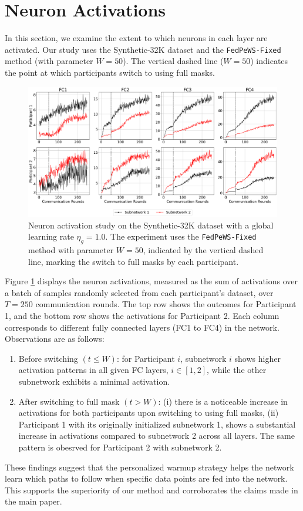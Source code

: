 \documentclass{article}
\begin{document}
\section{Neuron Activations} 
In this section, we examine the extent to which neurons in each layer are activated. Our study uses the Synthetic-32K dataset and the \texttt{FedPeWS-Fixed} method (with parameter $W = 50$). The vertical dashed line ($W=50$) indicates the point at which participants switch to using full masks. 

\begin{figure}[b]
    \centering
    \includegraphics[width=\linewidth]{images/neuron-activation-trainset.pdf}
    \caption{Neuron activation study on the Synthetic-32K dataset with a global learning rate $\eta_g=1.0$. The experiment uses the \texttt{FedPeWS-Fixed} method with parameter $W=50$, indicated by the vertical dashed line, marking the switch to full masks by each participant.} 
    \label{fig: neuron-activations-train}
\end{figure} 

Figure \ref{fig: neuron-activations-train} displays the neuron activations, measured as the sum of activations over a batch of samples randomly selected from each participant's dataset, over $T=250$ communication rounds. The top row shows the outcomes for Participant 1, and the bottom row shows the activations for Participant 2. Each column corresponds to different fully connected layers (FC1 to FC4) in the network. Observations are as follows: 
\begin{enumerate}
    \item Before switching $(t \leq W)$: for Participant $i$, subnetwork $i$ shows higher activation patterns in all given FC layers, $i \in [1,2]$, while the other subnetwork exhibits a minimal activation. 
    \item After switching to full mask $(t > W)$: (i) there is a noticeable increase in activations for both participants upon switching to using full masks, (ii) Participant 1 with its originally initialized subnetwork 1, shows a substantial increase in activations compared to subnetwork 2 across all layers. The same pattern is obesrved for Participant 2 with subnetwork 2. 
\end{enumerate}

These findings suggest that the personalized warmup strategy helps the network learn which paths to follow when specific data points are fed into the network. This supports the superiority of our method and corroborates the claims made in the main paper. 

\end{document}
